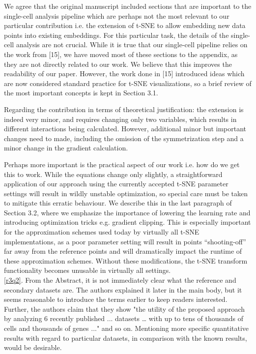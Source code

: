 \documentclass{article}
\newcounter{rtaskno}
\newcommand{\rtask}[1]{\refstepcounter{rtaskno}\label{#1}}
\newcommand{\reviewc}[2]{\begin{leftbar}\noindent\rtask{#1}\ref{#1}. #2\end{leftbar}}
\newcommand{\answer}[1]{\noindent #1\\[0mm]}
\newlength{\leftbarwidth}
\newlength{\leftbarsep}
\renewenvironment{leftbar}{%
    \def\FrameCommand{{\color{black}{\vrule width \leftbarwidth\relax\hspace {\leftbarsep}}}}%
    \MakeFramed {\advance \hsize -\width \FrameRestore }%
}{\endMakeFramed}
\begin{document}
\answer{
	We agree that the original manuscript included sections that are important to the single-cell analysis pipeline which are perhaps not the most relevant to our particular contribution i.e. the extension of t-SNE to allow embedding new data points into existing embeddings. For this particular task, the details of the single-cell analysis are not crucial. While it is true that our single-cell pipeline relies on the work from [15], we have moved most of these sections to the appendix, as they are not directly related to our work. We believe that this improves the readability of our paper. However, the work done in [15] introduced ideas which are now considered standard practice for t-SNE visualizations, so a brief review of the most important concepts is kept in Section 3.1.

	Regarding the contribution in terms of theoretical justification: the extension is indeed very minor, and requires changing only two variables, which results in different interactions being calculated. However, additional minor but important changes need to made, including the omission of the symmetrization step and a minor change in the gradient calculation.

	Perhaps more important is the practical aspect of our work i.e. how do we get this to work. While the equations change only slightly, a straightforward application of our approach using the currently accepted t-SNE parameter settings will result in wildly unstable optimization, so special care must be taken to mitigate this erratic behaviour. We describe this in the last paragraph of Section 3.2, where we emphasize the importance of lowering the learning rate and introducing optimization tricks e.g. gradient clipping. This is especially important for the approximation schemes used today by virtually all t-SNE implementations, as a poor parameter setting will result in points ``shooting-off'' far away from the reference points and will dramatically impact the runtime of these approximation schemes. Without these modifications, the t-SNE transform functionality becomes unusable in virtually all settings.
}


\reviewc{r3q2}{From the Abstract, it is not immediately clear what the reference and secondary datasets are. The authors explained it later in the main body, but it seems reasonable to introduce the terms earlier to keep readers interested. Further, the authors claim that they show "the utility of the proposed approach by analyzing 6 recently published ... datasets … with up to tens of thousands of cells and thousands of genes ..."  and so on. Mentioning more specific quantitative results with regard to particular datasets, in comparison with the known results, would be desirable. }
\end{document}
